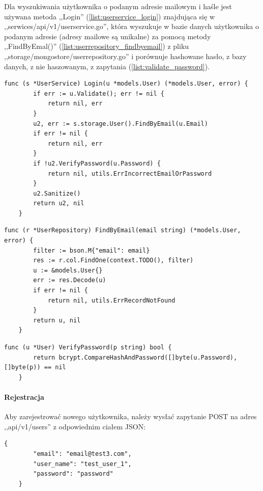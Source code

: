 Dla wyszukiwania użytkownika o podanym adresie mailowym i haśle jest używana metoda ,,Login'' (\ref{list:userservice_login}) znajdująca się w ,,serwices/api/v1/userservice.go'',
która wyszukuje w bazie danych użytkownika o podanym adresie (adresy mailowe są unikalne) za pomocą metody ,,FindByEmal()'' (\ref{list:userrepository_findbyemail}) z pliku ,,storage/mongostore/userrepository.go'' i porównuje hashowane hasło, z bazy danych, z nie haszowanym, z zapytania (\ref{list:validate_password}).
\begin{lstlisting}[label=list:userservice_login,caption=Serwis logowania uzytkownika,basicstyle=\tiny\ttfamily]
    func (s *UserService) Login(u *models.User) (*models.User, error) {
        if err := u.Validate(); err != nil {
            return nil, err
        }
        u2, err := s.storage.User().FindByEmail(u.Email)
        if err != nil {
            return nil, err
        }
        if !u2.VerifyPassword(u.Password) {
            return nil, utils.ErrIncorrectEmailOrPassword
        }
        u2.Sanitize()
        return u2, nil
    }
\end{lstlisting}

\begin{lstlisting}[label=list:userrepository_findbyemail,caption=Wysukiwanie użytkownika w bazie po adresie mailowym,basicstyle=\tiny\ttfamily]
    func (r *UserRepository) FindByEmail(email string) (*models.User, error) {
        filter := bson.M{"email": email}
        res := r.col.FindOne(context.TODO(), filter)
        u := &models.User{}
        err := res.Decode(u)
        if err != nil {
            return nil, utils.ErrRecordNotFound
        }
        return u, nil
    }
\end{lstlisting}

\begin{lstlisting}[label=list:validate_password,caption=Porównywanie hasła,basicstyle=\tiny\ttfamily]
    func (u *User) VerifyPassword(p string) bool {
        return bcrypt.CompareHashAndPassword([]byte(u.Password), []byte(p)) == nil
    }
\end{lstlisting}

\paragraph{Rejestracja}\newline
\newline

Aby zarejestrować nowego użytkownika, należy wysłać zapytanie POST na adres ,,api/v1/users'' z odpowiednim ciałem JSON:
\begin{lstlisting}[basicstyle=\tiny\ttfamily]
    {
        "email": "email@test3.com",
        "user_name": "test_user_1",
        "password": "password"
    }
\end{lstlisting}

